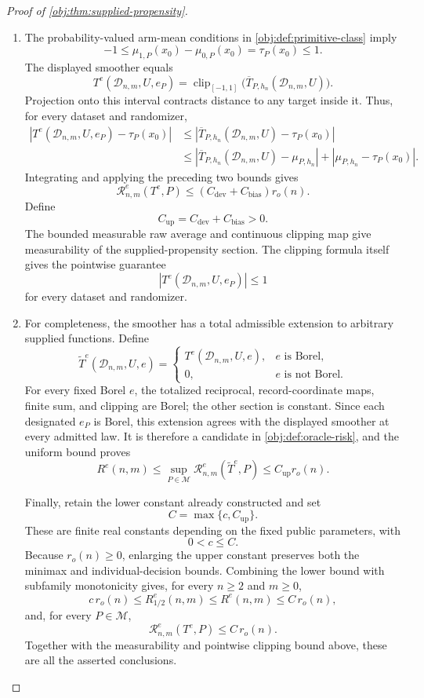 \begin{proof}[Proof of \cref{obj:thm:supplied-propensity}]
\begin{enumerate}
\item The probability-valued arm-mean conditions in \cref{obj:def:primitive-class} imply
\[
-1
\le
\mu_{1,P}(x_0)-\mu_{0,P}(x_0)
=
\tau_P(x_0)
\le1.
\]
The displayed smoother equals
\[
T^e(\mathcal D_{n,m},U,e_P)
=
\operatorname{clip}_{[-1,1]}
\bigl(\overline T_{P,h_n}(\mathcal D_{n,m},U)\bigr).
\]
Projection onto this interval contracts distance to any target inside it. Thus, for every dataset and randomizer,
\[
\begin{aligned}
|T^e(\mathcal D_{n,m},U,e_P)-\tau_P(x_0)|
&\le|\overline T_{P,h_n}(\mathcal D_{n,m},U)-\tau_P(x_0)|\\
&\le
|\overline T_{P,h_n}(\mathcal D_{n,m},U)-\mu_{P,h_n}|
+
|\mu_{P,h_n}-\tau_P(x_0)|.
\end{aligned}
\]
Integrating and applying the preceding two bounds gives
\[
\mathcal R^e_{n,m}(T^e,P)
\le
(C_{\mathrm{dev}}+C_{\mathrm{bias}})r_o(n).
\]
Define
\[
C_{\mathrm{up}}=C_{\mathrm{dev}}+C_{\mathrm{bias}}>0.
\]
The bounded measurable raw average and continuous clipping map give measurability of the supplied-propensity section. The clipping formula itself gives the pointwise guarantee
\[
\left|T^e(\mathcal D_{n,m},U,e_P)\right|\le1
\]
for every dataset and randomizer.

\item For completeness, the smoother has a total admissible extension to arbitrary supplied functions. Define
\[
\widetilde T^e(\mathcal D_{n,m},U,e)=
\begin{cases}
T^e(\mathcal D_{n,m},U,e),&e\text{ is Borel},\\
0,&e\text{ is not Borel}.
\end{cases}
\]
For every fixed Borel \(e\), the totalized reciprocal, record-coordinate maps, finite sum, and clipping are Borel; the other section is constant. Since each designated \(e_P\) is Borel, this extension agrees with the displayed smoother at every admitted law. It is therefore a candidate in \cref{obj:def:oracle-risk}, and the uniform bound proves
\[
R^e(n,m)
\le
\sup_{P\in\mathcal M}
\mathcal R^e_{n,m}(\widetilde T^e,P)
\le C_{\mathrm{up}}r_o(n).
\]

Finally, retain the lower constant already constructed and set
\[
C=\max\{c,C_{\mathrm{up}}\}.
\]
These are finite real constants depending on the fixed public parameters, with
\[
0<c\le C.
\]
Because \(r_o(n)\ge0\), enlarging the upper constant preserves both the minimax and individual-decision bounds. Combining the lower bound with subfamily monotonicity gives, for every \(n\ge2\) and \(m\ge0\),
\[
c\,r_o(n)
\le R^e_{1/2}(n,m)
\le R^e(n,m)
\le C\,r_o(n),
\]
and, for every \(P\in\mathcal M\),
\[
\mathcal R^e_{n,m}(T^e,P)\le C\,r_o(n).
\]
Together with the measurability and pointwise clipping bound above, these are all the asserted conclusions.
\end{enumerate}
\end{proof}

